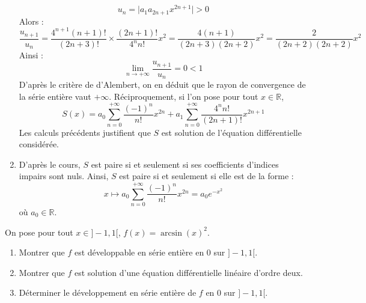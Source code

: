 \documentclass[a4paper,10pt]{report}
\begin{document}
\begin{enumerate}
$$ u_n = \vert a_1 a_{2n+1} x^{2n+1} \vert >0$$
Alors :
$$ \dfrac{u_{n+1}}{u_n} = \dfrac{4^{n+1} (n+1)!}{(2n+3)!} \times \dfrac{(2n+1)!}{4^n n!} x^2 = \dfrac{4 (n+1)}{(2n+3)(2n+2)}x^2 = \dfrac{2}{(2n+2)(2n+2)} x^2$$
Ainsi :
$$ \lim_{n \rightarrow + \infty} \dfrac{u_{n+1}}{u_n} = 0<1$$
D'après le critère de d'Alembert, on en déduit que le rayon de convergence de la série entière vaut $+ \infty$. Réciproquement, si l'on pose pour tout $x \in \mathbb{R}$,
$$ S(x) = a_0 \sum_{n=0}^{+ \infty} \dfrac{(-1)^n}{n!} x^{2n} + a_1 \sum_{n=0}^{+ \infty} \dfrac{4^n n!}{(2n+1)!} x^{2n+1}$$
Les calculs précédents justifient que $S$ est solution de l'équation différentielle considérée.
\item D'après le cours, $S$ est paire si et seulement si ses coefficients d'indices impairs sont nuls. Ainsi, $S$ est paire si et seulement si elle est de la forme : 
$$ x \mapsto a_0 \sum_{n=0}^{+ \infty} \dfrac{(-1)^n}{n!} x^{2n} = a_0 e^{-x^2}$$
où $a_0 \in \mathbb{R}$.
\end{enumerate}

\begin{Exercice}{} On pose pour tout $x \in ]-1,1[$, $f(x) = \arcsin(x)^2$.

\begin{enumerate}
\item Montrer que $f$ est développable en série entière en $0$ sur $]-1,1[$.
\item Montrer que $f$ est solution d'une équation différentielle linéaire d'ordre deux.
\item Déterminer le développement en série entière de $f$ en $0$ sur $]-1,1[$.
\end{enumerate}
\end{Exercice}

\corr 
\end{document}
